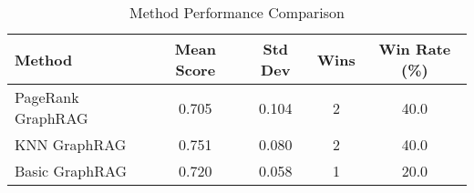 \begin{table}[h]
\centering
\begin{tabular}{|l|c|c|c|c|}
\hline
Method & Mean Score & Std Dev & Wins & Win Rate (\%) \\
\hline
PageRank GraphRAG & 0.705 & 0.104 & 2 & 40.0 \\
KNN GraphRAG & 0.751 & 0.080 & 2 & 40.0 \\
Basic GraphRAG & 0.720 & 0.058 & 1 & 20.0 \\
\hline
\end{tabular}
\caption{Method Performance Comparison}
\label{tab:method_comparison}
\end{table}

